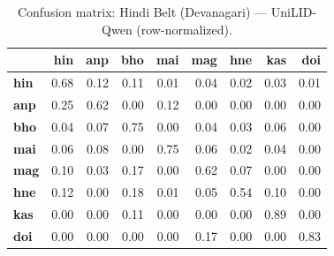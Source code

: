 \begin{table}[htbp]
\centering
\small
\begin{tabular}{lrrrrrrrr}
\toprule
 & \textbf{hin} & \textbf{anp} & \textbf{bho} & \textbf{mai} & \textbf{mag} & \textbf{hne} & \textbf{kas} & \textbf{doi} \\
\midrule
\textbf{hin} & \cellcolor{blue!67}\color{white}0.68 & \cellcolor{blue!11}0.12 & \cellcolor{blue!10}0.11 & \cellcolor{blue!0}0.01 & \cellcolor{blue!3}0.04 & \cellcolor{blue!2}0.02 & \cellcolor{blue!2}0.03 & \cellcolor{blue!0}0.01 \\
\textbf{anp} & \cellcolor{blue!25}0.25 & \cellcolor{blue!62}\color{white}0.62 & \cellcolor{blue!0}0.00 & \cellcolor{blue!12}0.12 & \cellcolor{blue!0}0.00 & \cellcolor{blue!0}0.00 & \cellcolor{blue!0}0.00 & \cellcolor{blue!0}0.00 \\
\textbf{bho} & \cellcolor{blue!4}0.04 & \cellcolor{blue!7}0.07 & \cellcolor{blue!75}\color{white}0.75 & \cellcolor{blue!0}0.00 & \cellcolor{blue!4}0.04 & \cellcolor{blue!2}0.03 & \cellcolor{blue!5}0.06 & \cellcolor{blue!0}0.00 \\
\textbf{mai} & \cellcolor{blue!5}0.06 & \cellcolor{blue!7}0.08 & \cellcolor{blue!0}0.00 & \cellcolor{blue!74}\color{white}0.75 & \cellcolor{blue!5}0.06 & \cellcolor{blue!1}0.02 & \cellcolor{blue!3}0.04 & \cellcolor{blue!0}0.00 \\
\textbf{mag} & \cellcolor{blue!10}0.10 & \cellcolor{blue!3}0.03 & \cellcolor{blue!17}0.17 & \cellcolor{blue!0}0.00 & \cellcolor{blue!62}\color{white}0.62 & \cellcolor{blue!6}0.07 & \cellcolor{blue!0}0.00 & \cellcolor{blue!0}0.00 \\
\textbf{hne} & \cellcolor{blue!12}0.12 & \cellcolor{blue!0}0.00 & \cellcolor{blue!18}0.18 & \cellcolor{blue!1}0.01 & \cellcolor{blue!4}0.05 & \cellcolor{blue!53}\color{white}0.54 & \cellcolor{blue!9}0.10 & \cellcolor{blue!0}0.00 \\
\textbf{kas} & \cellcolor{blue!0}0.00 & \cellcolor{blue!0}0.00 & \cellcolor{blue!11}0.11 & \cellcolor{blue!0}0.00 & \cellcolor{blue!0}0.00 & \cellcolor{blue!0}0.00 & \cellcolor{blue!88}\color{white}0.89 & \cellcolor{blue!0}0.00 \\
\textbf{doi} & \cellcolor{blue!0}0.00 & \cellcolor{blue!0}0.00 & \cellcolor{blue!0}0.00 & \cellcolor{blue!0}0.00 & \cellcolor{blue!16}0.17 & \cellcolor{blue!0}0.00 & \cellcolor{blue!0}0.00 & \cellcolor{blue!83}\color{white}0.83 \\
\bottomrule
\end{tabular}
\caption{Confusion matrix: Hindi Belt (Devanagari) — UniLID-Qwen (row-normalized).}
\label{tab:cm-hindi_belt-unilid-qwen}
\end{table}

